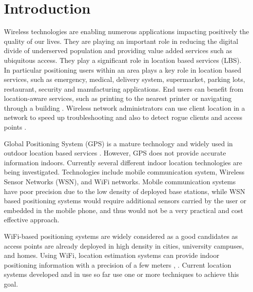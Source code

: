 \documentclass[journal]{IEEEtran} 				\IEEEoverridecommandlockouts 						\usepackage{amsmath,amssymb}
\begin{document}
\section{Introduction}\label{sec:intro}

Wireless technologies are enabling numerous applications impacting positively the quality of our lives. They are playing an important role in reducing the digital divide of underserved population and providing value added services such as ubiquitous access. They play a significant role in location based services (LBS). In particular positioning users within an area plays a key role in location based services, such as emergency, medical, delivery system, supermarket, parking lots, restaurant, security and manufacturing applications. End users can benefit from location-aware services, such as printing to the nearest printer or navigating through a building \cite{Bahl_Padmanabhan_2000}. Wireless network administrators can use client location in a network to speed up troubleshooting and also to detect rogue clients and access points \cite{cisco_wifi_lbs}.

Global Positioning System (GPS) is a mature technology and widely used in outdoor location based services \cite{misra1999special}. However, GPS does not provide accurate information indoors. Currently several different indoor location technologies are being investigated. Technologies include mobile communication system, Wireless Sensor Networks (WSN), and WiFi networks. Mobile communication systems have poor precision due to the low density of deployed base stations, while WSN based positioning systems would require additional sensors carried by the user or embedded in the mobile phone, and thus would not be a very practical and cost effective approach.

WiFi-based positioning systems are widely considered as a good candidates as access points are already deployed in high density in cities, university campuses, and homes. Using WiFi, location estimation systems can provide indoor positioning information with a precision of a few meters \cite{Bahl_Padmanabhan_2000}, \cite{Brown2011}. Current location systems developed and in use so far use one or more techniques to achieve this goal.
\end{document}
